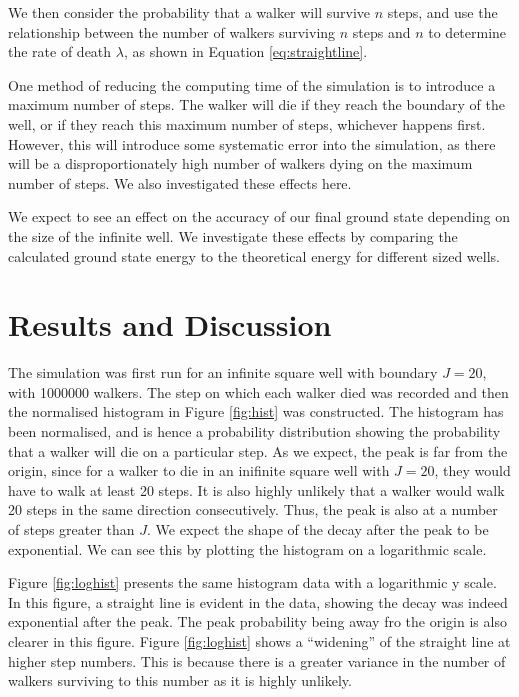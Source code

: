 \documentclass[journal]{IEEEtran}
\begin{document}
We then consider the probability that a walker will survive $n$ steps, and use
the relationship between the number of walkers surviving $n$ steps and $n$ to
determine the rate of death $\lambda$, as shown in Equation \ref{eq:straightline}.

One method of reducing the computing time of the simulation is to introduce a
maximum number of steps. The walker will die if they reach the boundary of the
well, or if they reach this maximum number of steps, whichever happens
first. However, this will introduce some systematic error into the simulation,
as there will be a disproportionately high number of walkers dying on the
maximum number of steps. We also investigated these effects here.

We expect to see an effect on the accuracy of our final ground state depending
on the size of the infinite well. We investigate these effects by comparing the
calculated ground state energy to the theoretical energy for different sized wells.


\section{Results and Discussion}
The simulation was first run for an infinite square well with boundary $J = 20$,
with 1000000 walkers. The step on which each walker died was recorded and then
the normalised histogram in Figure \ref{fig:hist} was constructed. The histogram
has been normalised, and is hence a probability distribution showing the
probability that a walker will die on a particular step. As we expect, the peak
is far from the origin, since for a walker to die in an inifinite square well
with $J=20$, they would have to walk at least 20 steps. It is also highly
unlikely that a walker would walk 20 steps in the same direction
consecutively. Thus, the peak is also at a number of steps greater than $J$. We
expect the shape of the decay after the peak to be exponential. We can see this
by plotting the histogram on a logarithmic scale.

Figure \ref{fig:loghist} presents the same histogram data with a logarithmic y
scale. In this figure, a straight line is evident in the data, showing the decay
was indeed exponential after the peak. The peak probability being away fro the
origin is also clearer in this figure. Figure \ref{fig:loghist} shows a
``widening'' of the straight line at higher step numbers. This is because there
is a greater variance in the number of walkers surviving to this number as it is
highly unlikely. 
\end{document}
